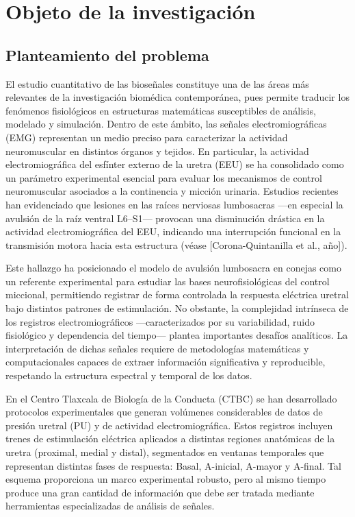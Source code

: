 \chapter{Objeto de la investigación}
\label{ObjetoInv}
 
\parskip=12pt
\section{Planteamiento del problema}\label{Seccion11}
\noindent El estudio cuantitativo de las bioseñales constituye una de las áreas más relevantes de la investigación biomédica contemporánea, pues permite traducir los fenómenos fisiológicos en estructuras matemáticas susceptibles de análisis, modelado y simulación. Dentro de este ámbito, las señales electromiográficas (EMG) representan un medio preciso para caracterizar la actividad neuromuscular en distintos órganos y tejidos. En particular, la actividad electromiográfica del esfínter externo de la uretra (EEU) se ha consolidado como un parámetro experimental esencial para evaluar los mecanismos de control neuromuscular asociados a la continencia y micción urinaria. Estudios recientes han evidenciado que lesiones en las raíces nerviosas lumbosacras —en especial la avulsión de la raíz ventral L6–S1— provocan una disminución drástica en la actividad electromiográfica del EEU, indicando una interrupción funcional en la transmisión motora hacia esta estructura (véase [Corona-Quintanilla et al., año]).

\noindent Este hallazgo ha posicionado el modelo de avulsión lumbosacra en conejas como un referente experimental para estudiar las bases neurofisiológicas del control miccional, permitiendo registrar de forma controlada la respuesta eléctrica uretral bajo distintos patrones de estimulación. No obstante, la complejidad intrínseca de los registros electromiográficos —caracterizados por su variabilidad, ruido fisiológico y dependencia del tiempo— plantea importantes desafíos analíticos. La interpretación de dichas señales requiere de metodologías matemáticas y computacionales capaces de extraer información significativa y reproducible, respetando la estructura espectral y temporal de los datos.

En el Centro Tlaxcala de Biología de la Conducta (CTBC) se han desarrollado protocolos experimentales que generan volúmenes considerables de datos de presión uretral (PU) y de actividad electromiográfica. Estos registros incluyen trenes de estimulación eléctrica aplicados a distintas regiones anatómicas de la uretra (proximal, medial y distal), segmentados en ventanas temporales que representan distintas fases de respuesta: Basal, A-inicial, A-mayor y A-final. Tal esquema proporciona un marco experimental robusto, pero al mismo tiempo produce una gran cantidad de información que debe ser tratada mediante herramientas especializadas de análisis de señales.


